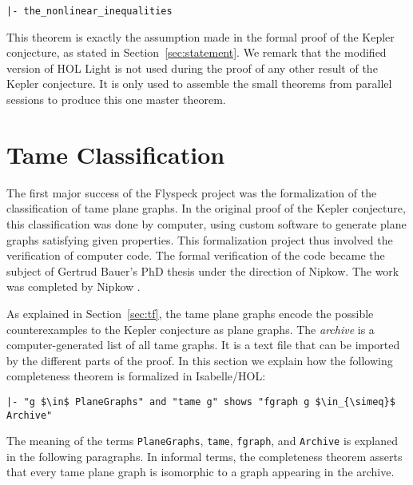 \begin{verbatim}
|- the_nonlinear_inequalities
\end{verbatim}

This theorem is exactly the assumption made in the formal proof of the
Kepler conjecture, as stated in Section~\ref{sec:statement}.  We
remark that the modified version of HOL Light is not used during the
proof of any other result of the Kepler conjecture.  It is only used
to assemble the small theorems from parallel sessions to produce this
one master theorem.

\section{Tame Classification}\label{sec:tc}



The first major success of the Flyspeck project was the formalization
of the classification of tame plane graphs. In the original proof of
the Kepler conjecture, this classification was done by computer, using
custom software to generate plane graphs satisfying given
properties. This formalization project thus involved the verification
of computer code. The formal verification of the code became the
subject of Gertrud Bauer's PhD thesis under the direction of
Nipkow. The work was completed by Nipkow \cite{NipkowBS-IJCAR06}.

As explained in Section~\ref{sec:tf}, the tame plane graphs encode
the possible counterexamples to the Kepler conjecture as plane
graphs. The {\it archive} is a computer-generated list of all tame
graphs. It is a text file that can be imported by the different parts
of the proof. In this section we explain how the following
completeness theorem is formalized in Isabelle/HOL:

\begin{lstlisting}[keepspaces=true,stringstyle=\tt,basicstyle=\small,%
frame=none,framesep=8pt,mathescape,morekeywords={and,shows},columns=flexible]
|- "g $\in$ PlaneGraphs" and "tame g" shows "fgraph g $\in_{\simeq}$ Archive"
\end{lstlisting}

The meaning of the
terms \verb!PlaneGraphs!, \verb!tame!, \verb!fgraph!, and
\verb!Archive! is explaned in the following paragraphs.
In informal terms, the completeness theorem 
asserts that every tame plane graph is
isomorphic to a graph appearing in the archive.  

